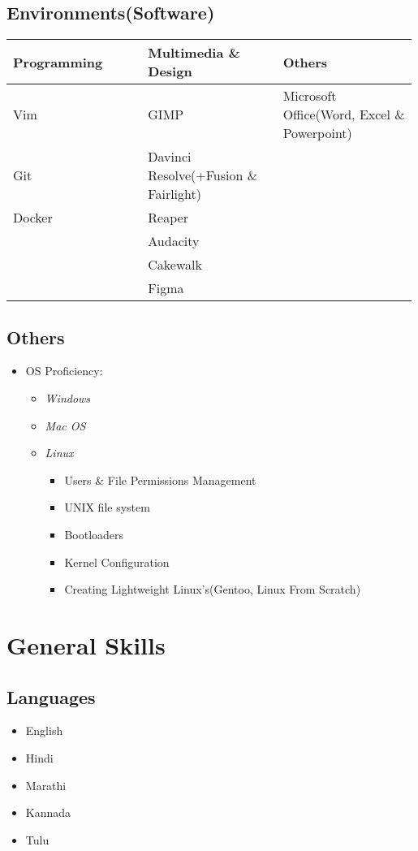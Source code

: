 \documentclass{article}
\newcommand{\thirdwidth}{0.33\linewidth}
\begin{document}
		\subsection{Environments(Software)}
			\begin{table}[h!]
				\begin{tabular}[c]{p{\thirdwidth}|p{\thirdwidth}|p{\thirdwidth}}
					\toprule
					\textbf{Programming} 	& 	\textbf{Multimedia \& Design}			& 	\textbf{Others}		\\
					\midrule
					Vim						&	GIMP									&	Microsoft Office(Word, Excel \& Powerpoint) \\
					Git						&   Davinci Resolve(+Fusion \& Fairlight)	&					\\
					Docker					&   Reaper									&					\\
											&   Audacity								&					\\
											&   Cakewalk								&					\\
											&   Figma									&					\\
					\bottomrule
				\end{tabular}
			\end{table}
		\subsection{Others}
			\begin{itemize}
				\item OS Proficiency: 
				\begin{itemize}
					\item \textsl{Windows}
					\item \textsl{Mac OS}
					\item \textsl{Linux}
					\begin{itemize}
						\item Users \& File Permissions Management
						\item UNIX file system
						\item Bootloaders
						\item Kernel Configuration
						\item Creating Lightweight Linux's(Gentoo, Linux From Scratch)
					\end{itemize}
				\end{itemize}
			\end{itemize}
	\section{General Skills}
		\subsection{Languages}
			\begin{itemize}
				\item English
				\item Hindi
				\item Marathi
				\item Kannada
				\item Tulu
			\end{itemize}
\end{document}
